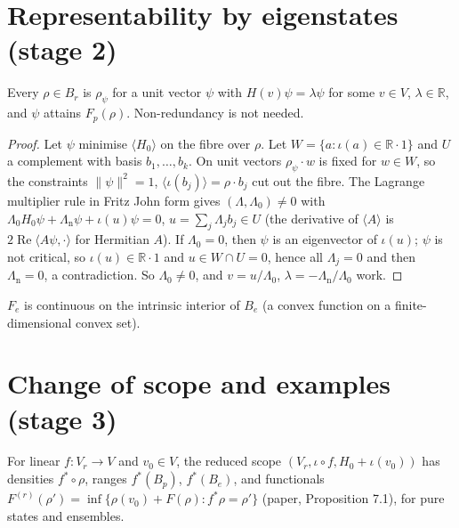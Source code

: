 \section{Representability by eigenstates (stage 2)}

\begin{theorem}\label{thm:scope-eig-vrep}
  \leanok
  Every $\rho\in B_r$ is $\rho_\psi$ for a unit vector $\psi$ with $H(v)\psi=\lambda\psi$ for some $v\in V$, $\lambda\in\mathbb R$, and $\psi$ attains
  $F_p(\rho)$. Non-redundancy is not needed.
\end{theorem}

\begin{proof}
  \leanok
  Let $\psi$ minimise $\langle H_0\rangle$ on the fibre over $\rho$. Let $W=\{a:\iota(a)\in\mathbb R\cdot1\}$ and $U$ a complement with basis
  $b_1,\dots,b_k$. On unit vectors $\rho_\psi\cdot w$ is fixed for $w\in W$, so the constraints $\|\psi\|^2=1$, $\langle\iota(b_j)\rangle=\rho\cdot b_j$
  cut out the fibre. The Lagrange multiplier rule in Fritz John form gives $(\Lambda,\Lambda_0)\neq0$ with
  $\Lambda_0H_0\psi+\Lambda_{\mathrm n}\psi+\iota(u)\psi=0$, $u=\sum_j\Lambda_jb_j\in U$ (the derivative of $\langle A\rangle$ is $2\operatorname{Re}\langle A\psi,\cdot\rangle$ for
  Hermitian $A$). If $\Lambda_0=0$, then $\psi$ is an eigenvector of $\iota(u)$; $\psi$ is not critical, so $\iota(u)\in\mathbb R\cdot1$ and
  $u\in W\cap U=0$, hence all $\Lambda_j=0$ and then $\Lambda_{\mathrm n}=0$, a contradiction. So $\Lambda_0\neq0$, and $v=u/\Lambda_0$,
  $\lambda=-\Lambda_{\mathrm n}/\Lambda_0$ work.
\end{proof}

\begin{theorem}[Continuity of $F_e$]\label{thm:scope-Fe-continuous}
  \leanok
  $F_e$ is continuous on the intrinsic interior of $B_e$ (a convex function on a finite-dimensional convex set).
\end{theorem}

\section{Change of scope and examples (stage 3)}

\begin{theorem}\label{thm:scope-change}
  \leanok
  For linear $f:V_r\to V$ and $v_0\in V$, the reduced scope $(V_r,\iota\circ f,H_0+\iota(v_0))$ has densities $f^*\circ\rho$, ranges
  $f^*(B_p)$, $f^*(B_e)$, and functionals $F^{(r)}(\rho')=\inf\{\rho(v_0)+F(\rho):f^*\rho=\rho'\}$ (paper, Proposition 7.1), for pure states
  and ensembles.
\end{theorem}

